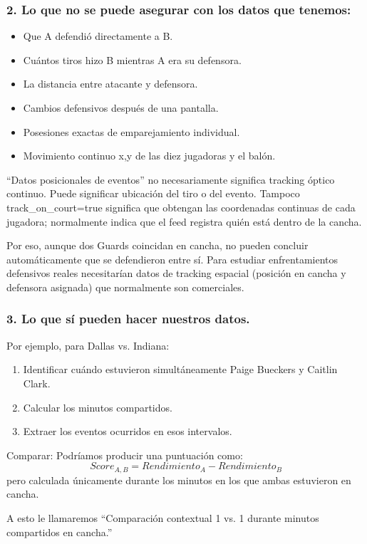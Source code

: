 \subsubsection*{2. Lo que no se puede asegurar con los datos que tenemos:}
\begin{itemize}
\item Que A defendió directamente a B.
\item Cuántos tiros hizo B mientras A era su defensora.
\item La distancia entre atacante y defensora.
\item Cambios defensivos después de una pantalla.
\item Posesiones exactas de emparejamiento individual.
\item Movimiento continuo x,y de las diez jugadoras y el balón.
\end{itemize}

“Datos posicionales de eventos” no necesariamente significa tracking óptico continuo. Puede significar ubicación del tiro o del evento. Tampoco track\_on\_court=true significa que obtengan las coordenadas continuas de cada jugadora; normalmente indica que el feed registra quién está dentro de la cancha.

Por eso, aunque dos Guards coincidan en cancha, no pueden concluir automáticamente que se defendieron entre sí. Para estudiar enfrentamientos defensivos reales necesitarían datos de tracking espacial (posición en cancha y defensora asignada) que normalmente son comerciales.

\subsubsection*{3. Lo que sí pueden hacer nuestros datos.}
Por ejemplo, para Dallas vs. Indiana:
\begin{enumerate}
\item Identificar cuándo estuvieron simultáneamente Paige Bueckers y Caitlin Clark.
\item Calcular los minutos compartidos.
\item Extraer los eventos ocurridos en esos intervalos.
\end{enumerate}
Comparar: Podríamos producir una puntuación como:
\[
Score_{A,B}=Rendimiento_A-Rendimiento_B
\]
pero calculada únicamente durante los minutos en los que ambas estuvieron en cancha.

A esto le llamaremos “Comparación contextual 1 vs. 1 durante minutos compartidos en cancha.”

